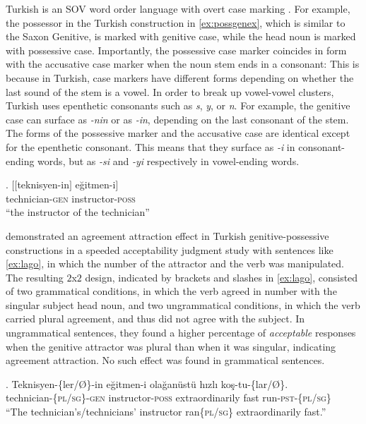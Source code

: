\documentclass[]{interact}\usepackage[]{graphicx}\usepackage[]{color}
\theoremstyle{plain}%
\theoremstyle{definition}
\theoremstyle{remark}
\newcommand{\rev}[1]{{\color{red}#1}}
\begin{document}
Turkish is an SOV word order language with overt case marking \citep{GokselKerslake:2005,Kornfilt:2011,Kornfilt:2013}. 
For example, the possessor in the Turkish construction in \ref{ex:possgenex}, which is similar to the Saxon Genitive, is marked with genitive case, while the head noun is marked with possessive case. 
Importantly, the possessive case marker coincides in form with the accusative case marker when the noun stem ends in a consonant:
This is because in Turkish, case markers have different forms depending on whether the last sound of the stem is a vowel. In order to break up vowel-vowel clusters, Turkish uses epenthetic consonants such as \textit{s}, \textit{y}, or \textit{n}.  For example, the genitive case can surface as \textit{-nin} or as \textit{-in}, depending on the last consonant of the stem. The forms of the possessive marker and the accusative case are identical except for the epenthetic consonant. This means that they surface as \textit{-i} in consonant-ending words, but as \textit{-si} and \textit{-yi} respectively in vowel-ending words. 

\ex. \label{ex:possgenex}
\gll $[$$[$teknisyen-in$]$ e\u{g}itmen-i$]$ \\
    technician-\textsc{gen} instructor-\textsc{poss} \\
\glt ``the instructor of the technician''


\citet{LagoEtAl:2019} demonstrated an agreement attraction effect in Turkish genitive-possessive constructions in a speeded acceptability judgment study with sentences like \ref{ex:lago}, in which the number of the attractor and the verb was manipulated. The resulting $2$x$2$ design, indicated by brackets and slashes in \ref{ex:lago}, consisted of two grammatical conditions, in which the verb agreed \rev{in number} with the singular subject head noun, and two ungrammatical conditions, in which the verb carried plural agreement, and thus did not agree with the subject. In ungrammatical sentences, they found a higher percentage of \textit{acceptable} responses when the genitive attractor was plural than when it was singular, indicating agreement attraction. No such effect was found in grammatical sentences.


\ex. \label{ex:lago}
\gll Teknisyen-\{ler/\O\}-in e\u{g}itmen-i ola\u{g}an{\"u}st{\"u} h{\i}zl{\i} ko\c{s}-tu-\{lar/\O\}.\\
technician-\{\textsc{pl}/\textsc{sg}\}-\textsc{gen} instructor-\textsc{poss} extraordinarily fast run-\textsc{pst}-\{\textsc{pl}/\textsc{sg}\}\\
\glt ``The technician's/technicians' instructor \rev{ran\{\textsc{pl}/\textsc{sg}\}} extraordinarily fast.''
\end{document}
